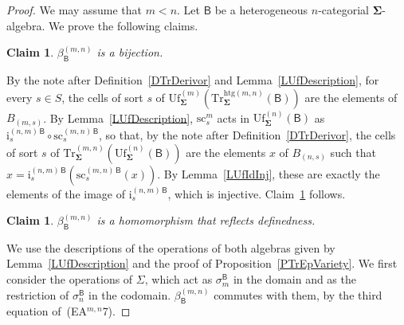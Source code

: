 \documentclass[a4paper, reqno]{amsbook}
\newcommand{\sig}[1]{\mathbf{#1}}             %
\newcommand{\calg}[1]{\boldsymbol{\mathsf{#1}}} %
\newcommand{\htg}{\mathrm{htg}}                %
\newcommand{\src}{\mathrm{sc}}
\newcommand{\Uf}{\mathrm{Uf}}
\newcommand{\Tr}{\mathrm{Tr}}
\theoremstyle{plain}
\newtheorem{claim}[theorem]{Claim}
\theoremstyle{definition}
\begin{document}
\begin{proof}
We may assume that $m<n$.
Let $\calg{B}$ be a heterogeneous $n$-categorial $\sig{\Sigma}$-algebra.
We prove the following claims.

\begin{claim}\label{ClCompatUfTrA}
$\beta^{(m,n)}_{\calg{B}}$ is a bijection.
\end{claim}
By the note after Definition~\ref{DTrDerivor} and Lemma~\ref{LUfDescription}, for every $s\in S$, the cells of sort $s$ of $\Uf^{(m)}_{\sig{\Sigma}}(\Tr^{\htg(m,n)}_{\sig{\Sigma}}(\calg{B}))$ are the elements of $B_{(m,s)}$.
By Lemma~\ref{LUfDescription}, $\src^{m}_{s}$ acts in $\Uf^{(n)}_{\sig{\Sigma}}(\calg{B})$ as $\mathrm{i}^{(n,m)\,\calg{B}}_{s}\circ\src^{(m,n)\,\calg{B}}_{s}$, so that, by the note after Definition~\ref{DTrDerivor}, the cells of sort $s$ of $\Tr^{(m,n)}_{\sig{\Sigma}}(\Uf^{(n)}_{\sig{\Sigma}}(\calg{B}))$ are the elements $x$ of $B_{(n,s)}$ such that $x=\mathrm{i}^{(n,m)\,\calg{B}}_{s}(\src^{(m,n)\,\calg{B}}_{s}(x))$.
By Lemma~\ref{LUfIdInj}, these are exactly the elements of the image of $\mathrm{i}^{(n,m)\,\calg{B}}_{s}$, which is injective.
Claim~\ref{ClCompatUfTrA} follows.

\begin{claim}\label{ClCompatUfTrB}
$\beta^{(m,n)}_{\calg{B}}$ is a homomorphism that reflects definedness.
\end{claim}
We use the descriptions of the operations of both algebras given by Lemma~\ref{LUfDescription} and the proof of Proposition~\ref{PTrEpVariety}.
We first consider the operations of $\Sigma$, which act as $\sigma^{\calg{B}}_{m}$ in the domain and as the restriction of $\sigma^{\calg{B}}_{n}$ in the codomain.
$\beta^{(m,n)}_{\calg{B}}$ commutes with them, by the third equation of~(EA$^{m,n}$7).


\end{proof}
\end{document}
